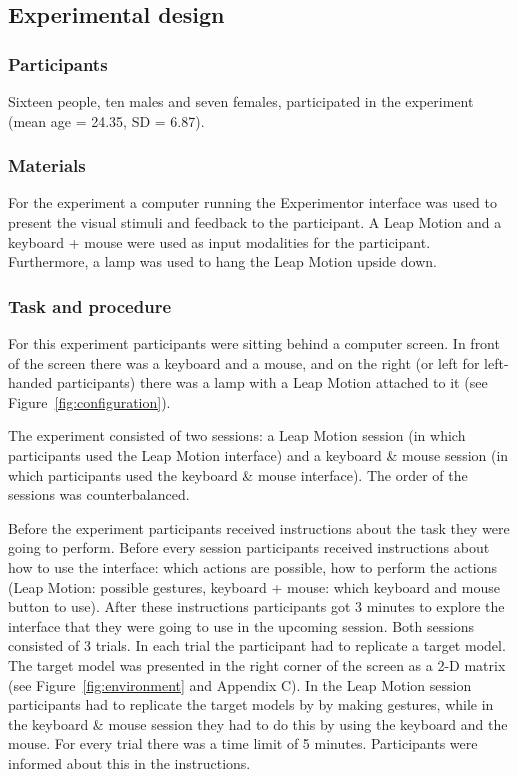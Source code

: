 \subsection{Experimental design}
\subsubsection{Participants}
Sixteen people, ten males and seven females, participated in the experiment (mean age = 24.35, SD = 6.87). 
\subsubsection{Materials}
For the experiment a computer running the Experimentor interface was used to present the visual stimuli and feedback to the participant. A Leap Motion and a keyboard + mouse
 were used as input modalities for the participant. Furthermore, a lamp was used to hang the Leap Motion upside down.
\subsubsection{Task and procedure}
For this experiment participants were sitting behind a computer screen. In front of the screen there was a keyboard and a mouse, and on the right (or left for left-handed 
participants) there was a lamp with a Leap Motion attached to it (see Figure~\ref{fig:configuration}).

The experiment consisted of two sessions: a Leap Motion session (in which participants used the Leap Motion interface) and a keyboard \& mouse session (in which participants 
used the keyboard \& mouse interface). The order of the sessions was counterbalanced.

Before the experiment participants received instructions about the task they were going to perform. Before every session participants received instructions about how to use 
the interface: which actions are possible, how to perform the actions (Leap Motion: possible gestures, keyboard + mouse: which keyboard and mouse button to use). After these 
instructions participants got 3 minutes to explore the interface that they were going to use in the upcoming session. 
Both sessions consisted of 3 trials. In each trial the participant had to replicate a target model. The target model was presented in the right corner of the screen as a 2-D
 matrix (see Figure~\ref{fig:environment} and Appendix C). In the Leap Motion session participants had to replicate the target models by by making gestures, while in the 
 keyboard \& mouse session they had to do this by using the keyboard and the mouse. For every trial there was a time limit of 5 minutes. Participants were informed about 
 this in the instructions.

